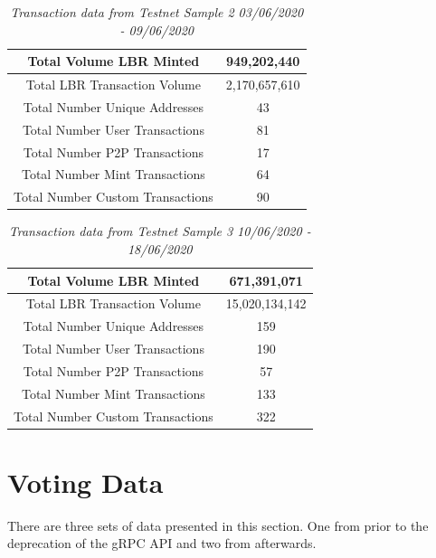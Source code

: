 \documentclass[12pt,openany,a4paper]{book}
\begin{document}
\begin{table}[h!]
    \caption{\sl Transaction data from Testnet Sample 2 03/06/2020 - 09/06/2020}
    \label{tx_table_2}
\begin{center}
\begin{tabular}{ |c|c| } 
    \hline
    Total Volume LBR Minted & 949,202,440 \\
    \hline
    Total LBR Transaction Volume & 2,170,657,610 \\
    \hline
    Total Number Unique Addresses & 43 \\
    \hline
    Total Number User Transactions & 81 \\
    \hline
    Total Number P2P Transactions & 17 \\
    \hline
    Total Number Mint Transactions & 64 \\
    \hline
    Total Number Custom Transactions & 90 \\
    \hline
\end{tabular}
\end{center}
\end{table}

\begin{table}[h!]
    \caption{\sl Transaction data from Testnet Sample 3 10/06/2020 - 18/06/2020}
    \label{tx_table_3}
\begin{center}
\begin{tabular}{ |c|c| } 
    \hline
    Total Volume LBR Minted & 671,391,071 \\
    \hline
    Total LBR Transaction Volume & 15,020,134,142 \\
    \hline
    Total Number Unique Addresses & 159 \\
    \hline
    Total Number User Transactions & 190 \\
    \hline
    Total Number P2P Transactions & 57 \\
    \hline
    Total Number Mint Transactions & 133 \\
    \hline
    Total Number Custom Transactions & 322 \\
    \hline
\end{tabular}
\end{center}
\end{table}

\section{Voting Data}
\label{results:validator_voting_data}
There are three sets of data presented in this section. One from prior to the deprecation of 
the gRPC API and two from afterwards.
\end{document}
